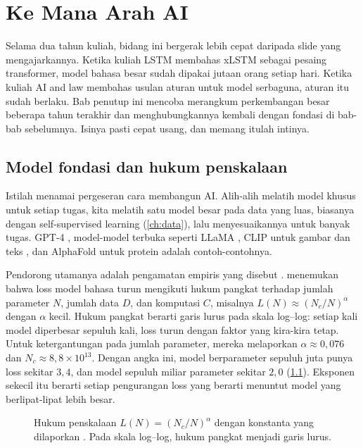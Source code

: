 \chapter{Ke Mana Arah AI}
\label{ch:terbaru}

Selama dua tahun kuliah, bidang ini bergerak lebih cepat daripada slide yang mengajarkannya. Ketika
kuliah LSTM membahas xLSTM sebagai pesaing transformer, model bahasa besar sudah dipakai jutaan orang
setiap hari. Ketika kuliah AI and law membahas usulan aturan untuk model serbaguna, aturan itu sudah
berlaku. Bab penutup ini mencoba merangkum perkembangan besar beberapa tahun terakhir dan menghubungkannya
kembali dengan fondasi di bab-bab sebelumnya. Isinya pasti cepat usang, dan memang itulah intinya.

\section{Model fondasi dan hukum penskalaan}

Istilah  \citep{bommasani2021} menamai pergeseran cara membangun AI. Alih-alih
melatih model khusus untuk setiap tugas, kita melatih satu model besar pada data yang luas,
biasanya dengan self-supervised learning (\cref{ch:data}), lalu menyesuaikannya untuk banyak tugas. GPT-4
\citep{openai2023}, model-model terbuka seperti LLaMA \citep{touvron2023}, CLIP untuk gambar dan teks
\citep{radford2021}, dan AlphaFold untuk protein adalah contoh-contohnya.

Pendorong utamanya adalah pengamatan empiris yang disebut . \citet{kaplan2020}
menemukan bahwa loss model bahasa turun mengikuti hukum pangkat terhadap jumlah parameter $N$, jumlah
data $D$, dan komputasi $C$, misalnya $L(N)\approx(N_c/N)^{\alpha}$ dengan $\alpha$ kecil. Hukum pangkat
berarti garis lurus pada skala log--log: setiap kali model diperbesar sepuluh kali, loss turun dengan
faktor yang kira-kira tetap. Untuk ketergantungan pada jumlah parameter, mereka melaporkan $\alpha\approx0{,}076$
dan $N_c\approx8{,}8\times10^{13}$. Dengan angka ini, model berparameter sepuluh juta punya loss sekitar $3{,}4$, dan
model sepuluh miliar parameter sekitar $2{,}0$ (\cref{fig:scaling}). Eksponen sekecil itu berarti setiap pengurangan
loss yang berarti menuntut model yang berlipat-lipat lebih besar.

\begin{figure}[ht]
\centering
{}
\caption{Hukum penskalaan $L(N)=(N_c/N)^{\alpha}$ dengan konstanta yang dilaporkan \citet{kaplan2020}. Pada skala
log--log, hukum pangkat menjadi garis lurus.}
\label{fig:scaling}
\end{figure}

